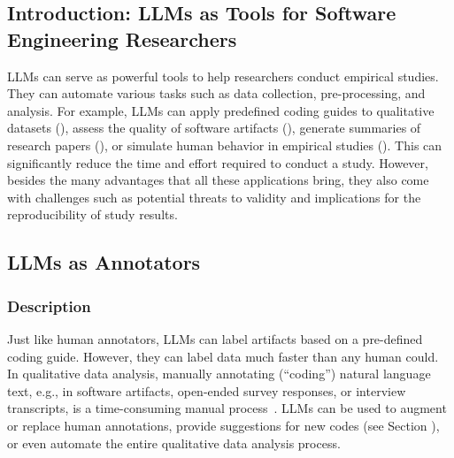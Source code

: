 



\subsection{Introduction: LLMs as Tools for Software Engineering Researchers}
\label{sec:llms-as-tools-for-software-engineering-researchers}

LLMs can serve as powerful tools to help researchers conduct empirical studies.
They can automate various tasks such as data collection, pre-processing, and analysis.
For example, LLMs can apply predefined coding guides to qualitative datasets (\annotators), assess the quality of software artifacts (\judges), generate summaries of research papers (\synthesis), or simulate human behavior in empirical studies (\subjects).
This can significantly reduce the time and effort required to conduct a study.
However, besides the many advantages that all these applications bring, they also come with challenges such as potential threats to validity and implications for the reproducibility of study results.


\subsection{LLMs as Annotators}
\label{sec:llms-as-annotators}

\subsubsection{Description}
Just like human annotators, LLMs can label artifacts based on a pre-defined coding guide.
However, they can label data much faster than any human could. 
In qualitative data analysis, manually annotating (``coding'') natural language text, e.g., in software artifacts, open-ended survey responses, or interview transcripts, is a time-consuming manual process~\cite{DBLP:journals/ase/BanoHZT24}.
LLMs can be used to augment or replace human annotations, provide suggestions for new codes (see Section \synthesis), or even automate the entire qualitative data analysis process.

